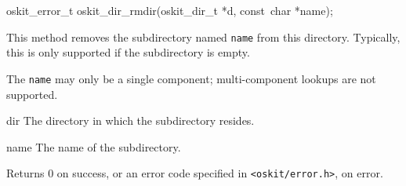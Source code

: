 \begin{apisyn}

	\funcproto oskit_error_t
	oskit_dir_rmdir(oskit_dir_t *d, const~char *name);	
\end{apisyn}
\ostofs
\begin{apidesc}
	This method removes the subdirectory named {\tt name} 
	from this directory.  Typically, this is only
	supported if the subdirectory is empty.

	The {\tt name} may only be a single component; 
	multi-component lookups are not supported.
\end{apidesc}
\begin{apiparm}
	\item[dir]
		The directory in which the subdirectory resides.
	\item[name]
		The name of the subdirectory.
\end{apiparm}
\begin{apiret}
	Returns 0 on success, or an error code specified in
	{\tt <oskit/error.h>}, on error.
\end{apiret}


